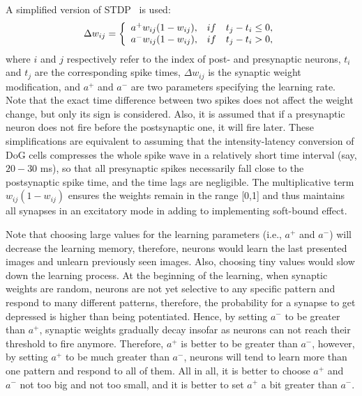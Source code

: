 \documentclass[preprint,5p,12pt,twocolumn]{article}
\begin{document}
A simplified version of STDP~\cite{masquelier2007unsupervised} is used:
\begin{eqnarray}
\label{eq:STDP}
\Delta w_{ij}=
\left\{
  \begin{array}{l l l}
    a^{+}w_{ij}(1-w_{ij}),&  if & t_{j}-t_{i}\leq 0, \\
    a^{-}w_{ij}(1-w_{ij}),&  if & t_{j}-t_{i} > 0,
  \end{array} \right.
\end{eqnarray}
where $ i $ and $ j $ respectively refer to the index of post- and presynaptic neurons,
$t_i$ and $t_j$ are the corresponding spike times, $\Delta w_{ij}$ is the synaptic weight modification, and $a^{+}$ and $a^{-}$ are two parameters specifying the
learning rate. Note that the exact time difference between two spikes does not affect the weight change, but only its sign is considered. Also, it is assumed that if a presynaptic neuron does not fire before the postsynaptic one, it will fire later. These simplifications are equivalent to assuming that the intensity-latency conversion of DoG cells compresses the whole spike wave in a relatively short time interval (say, $20-30$ ms), so that all presynaptic spikes necessarily fall close to the postsynaptic spike time, and the time lags are negligible. The multiplicative term $w_{ij}(1-w_{ij})$ ensures the weights remain in the range [0,1] and thus maintains all synapses in an excitatory mode in adding to implementing soft-bound effect.

Note that choosing large values for the learning parameters (i.e., $a^{+}$ and $a^{-}$) will decrease the learning memory, therefore, neurons would learn the last presented images and unlearn previously seen images. Also, choosing tiny values would slow down the learning process. At the beginning of the learning, when synaptic weights are random, neurons are not yet selective to any specific pattern and respond to many different patterns, therefore, the probability for a synapse to get depressed is higher than being potentiated. Hence, by setting $a^{-}$ to be greater than $a^{+}$, synaptic weights gradually decay insofar as neurons can not reach their threshold to fire anymore. Therefore, $a^{+}$ is better to be greater than $a^{-}$, however, by setting $a^{+}$ to be much greater than $a^{-}$, neurons will tend to learn more than one pattern and respond to all of them. All in all, it is better to choose $a^{+}$ and $a^{-}$ not too big and not too small, and it is better to set $a^{+}$ a bit greater than $a^{-}$.
\end{document}
